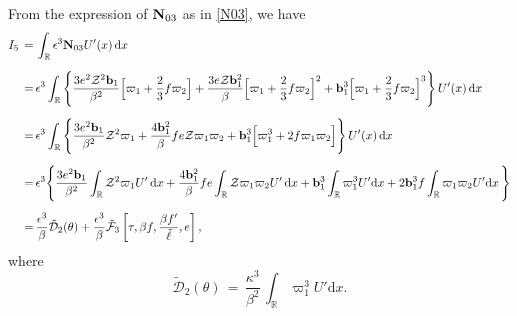 \documentclass[10pt, reqno]{amsart}
\numberwithin{equation}{section}
\theoremstyle{definition}
\begin{document}
{From the expression of ${\bf N}_{03}$ as in \eqref{N03}, we have
\begin{align}\label{I5}
I_5\,=\,&\int_{{\mathbb R}}\epsilon^3 {\bf N}_{03}U'(x)\,{\mathrm d}x
\nonumber\\[2mm]
 \, =\,&\epsilon^3
\int_{{\mathbb R}}\Bigg\{\frac{3 e^2\mathcal Z^2 {\mathbf b}_1}{\beta^2}\Big[\varpi_1 + \frac{2}{3}f \varpi_2\Big]
+ \frac{3 e{\mathcal Z} {\mathbf b}_1^2}{\beta}\Big[\varpi_1 + \frac{2}{3}f \varpi_2\Big]^2
+ {\mathbf b}_1^3\Big[\varpi_1 + \frac{2}{3}f \varpi_2\Big]^3
\Bigg\} \, U'(x) \,{\mathrm d}x
\nonumber\\[2mm]
 \, =\,&\epsilon^3
\int_{{\mathbb R}}\Bigg\{\frac{3 e^2 {\mathbf b}_1}{\beta^2}\mathcal Z^2\varpi_1
+ \frac{4 {\mathbf b}_1^2}{\beta}f e{\mathcal Z}\varpi_1  \varpi_2
+ {\mathbf b}_1^3\Big[\varpi_1^3+ 2f \varpi_1 \varpi_2\Big]
\Bigg\} \, U'(x) \,{\mathrm d}x
\nonumber\\[2mm]
 \, =\,&\epsilon^3
\Bigg\{\frac{3 e^2 {\mathbf b}_1}{\beta^2}\int_{{\mathbb R}}\mathcal Z^2\varpi_1 U' \,{\mathrm d}x
+\frac{4 {\mathbf b}_1^2}{\beta}f e\int_{{\mathbb R}} {\mathcal Z}\varpi_1  \varpi_2 U'\,{\mathrm d}x
+{\mathbf b}_1^3\int_{{\mathbb R}} \varpi_1^3U'{\mathrm d}x
+ 2{\mathbf b}_1^3f \int_{{\mathbb R}}\varpi_1 \varpi_2 U'{\mathrm d}x\,
\Bigg\}
\nonumber\\[2mm]
 \, =\,&\frac{\epsilon^3}{\beta}\tilde{\mathcal D}_2(\theta)
+\frac{\epsilon^3}{\beta}\tilde{\mathcal F}_{3}\left[\tau, \beta f, \frac{\beta {f}'}{\tilde\ell}, e\right],
\end{align}
where
\begin{equation*}
\tilde{\mathcal D}_2(\theta) \,=\, \frac{\kappa^3}{\beta^2}\,\int_{{\mathbb R}} \varpi_1^3U'{\mathrm d}x.
\end{equation*}


}
\end{document}
